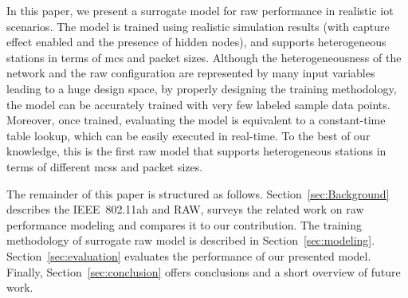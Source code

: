 In this paper, we present a surrogate model for \gls{raw} performance in realistic \gls{iot} scenarios. The model is trained using realistic simulation results (with capture effect enabled and the presence of hidden nodes), and supports heterogeneous stations in terms of \gls{mcs} and packet sizes. Although the heterogeneousness of the network and  the \gls{raw} configuration are represented by many input variables leading to a huge design space, by properly designing the  training methodology, the model can be accurately trained with very few labeled sample data points. Moreover, once trained, evaluating the model is equivalent to a constant-time table lookup, which can be easily executed in real-time. To the best of our knowledge, this is the first \gls{raw} model that supports heterogeneous stations in terms of different \gls{mcs}s and packet sizes.


The remainder of this paper is structured as follows. Section~\ref{sec:Background} describes the IEEE~802.11ah and RAW, surveys the related work on \gls{raw} performance modeling and compares it to our contribution.
The training methodology of surrogate \gls{raw} model is described in Section~\ref{sec:modeling}. Section~\ref{sec:evaluation} evaluates the performance of our presented model. Finally, Section~\ref{sec:conclusion} offers conclusions and a short overview of future work.


